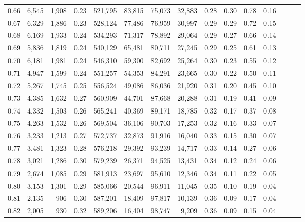 \begin{tabular}{rrrrrrrrrrrrrrr}
0.66 &   6,545 &  1,908 &  0.23 &  521,795 &   83,815 &   75,073 &   32,883 &  0.28 &  0.30 &  0.78 &      0.16 \\
0.67 &   6,329 &  1,886 &  0.23 &  528,124 &   77,486 &   76,959 &   30,997 &  0.29 &  0.29 &  0.72 &      0.15 \\
0.68 &   6,169 &  1,933 &  0.24 &  534,293 &   71,317 &   78,892 &   29,064 &  0.29 &  0.27 &  0.66 &      0.14 \\
0.69 &   5,836 &  1,819 &  0.24 &  540,129 &   65,481 &   80,711 &   27,245 &  0.29 &  0.25 &  0.61 &      0.13 \\
0.70 &   6,181 &  1,981 &  0.24 &  546,310 &   59,300 &   82,692 &   25,264 &  0.30 &  0.23 &  0.55 &      0.12 \\
0.71 &   4,947 &  1,599 &  0.24 &  551,257 &   54,353 &   84,291 &   23,665 &  0.30 &  0.22 &  0.50 &      0.11 \\
0.72 &   5,267 &  1,745 &  0.25 &  556,524 &   49,086 &   86,036 &   21,920 &  0.31 &  0.20 &  0.45 &      0.10 \\
0.73 &   4,385 &  1,632 &  0.27 &  560,909 &   44,701 &   87,668 &   20,288 &  0.31 &  0.19 &  0.41 &      0.09 \\
0.74 &   4,332 &  1,503 &  0.26 &  565,241 &   40,369 &   89,171 &   18,785 &  0.32 &  0.17 &  0.37 &      0.08 \\
0.75 &   4,263 &  1,532 &  0.26 &  569,504 &   36,106 &   90,703 &   17,253 &  0.32 &  0.16 &  0.33 &      0.07 \\
0.76 &   3,233 &  1,213 &  0.27 &  572,737 &   32,873 &   91,916 &   16,040 &  0.33 &  0.15 &  0.30 &      0.07 \\
0.77 &   3,481 &  1,323 &  0.28 &  576,218 &   29,392 &   93,239 &   14,717 &  0.33 &  0.14 &  0.27 &      0.06 \\
0.78 &   3,021 &  1,286 &  0.30 &  579,239 &   26,371 &   94,525 &   13,431 &  0.34 &  0.12 &  0.24 &      0.06 \\
0.79 &   2,674 &  1,085 &  0.29 &  581,913 &   23,697 &   95,610 &   12,346 &  0.34 &  0.11 &  0.22 &      0.05 \\
0.80 &   3,153 &  1,301 &  0.29 &  585,066 &   20,544 &   96,911 &   11,045 &  0.35 &  0.10 &  0.19 &      0.04 \\
0.81 &   2,135 &    906 &  0.30 &  587,201 &   18,409 &   97,817 &   10,139 &  0.36 &  0.09 &  0.17 &      0.04 \\
0.82 &   2,005 &    930 &  0.32 &  589,206 &   16,404 &   98,747 &    9,209 &  0.36 &  0.09 &  0.15 &      0.04 \\

\end{tabular}
